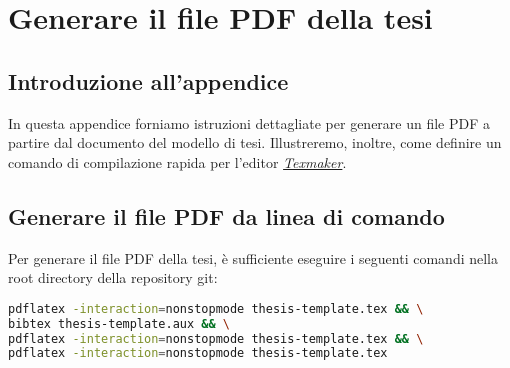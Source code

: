 \chapter{Generare il file PDF della tesi}
\label{appendix:compilazione}

\acresetall

\section{Introduzione all'appendice}

In questa appendice forniamo istruzioni dettagliate per generare un file PDF a partire dal documento \latex del modello di tesi. Illustreremo, inoltre, come definire un comando di compilazione rapida per l'editor \href{https://www.xm1math.net/texmaker/}{\textit{Texmaker}}.

\section{Generare il file PDF da linea di comando}

Per generare il file PDF della tesi, è sufficiente eseguire i seguenti comandi{\footnotemark} nella root directory della repository git:

\begin{lstlisting}[language=bash]
pdflatex -interaction=nonstopmode thesis-template.tex && \
bibtex thesis-template.aux && \
pdflatex -interaction=nonstopmode thesis-template.tex && \
pdflatex -interaction=nonstopmode thesis-template.tex
\end{lstlisting}


\medskip

